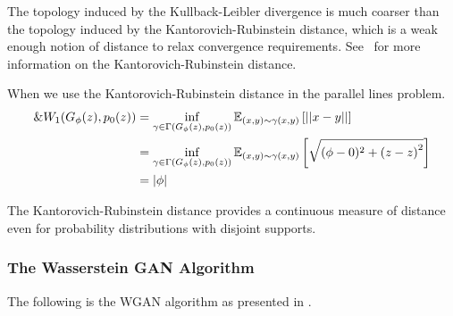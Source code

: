The topology induced by the Kullback-Leibler divergence is much
coarser than the topology induced by the Kantorovich-Rubinstein
distance, which is a weak enough notion of distance to relax
convergence requirements. See~\cite{ref:villani-2008} for more
information on the Kantorovich-Rubinstein distance.

\begin{example}
  When we use the Kantorovich-Rubinstein distance in the parallel
  lines problem.
  \begin{align}
    \&W_1(G_\phi(z), p_0(z)) & = \inf_{\gamma \in
                           \Gamma(G_\phi(z),p_0(z))}\mathbb{E}_{(x,y) \sim
                           \gamma(x, y)} \left[ || x-y || \right] \\
                         & =\inf_{\gamma \in \Gamma(G_\phi(z),
                           p_0(z))}\mathbb{E}_{(x,y) \sim \gamma(x,
                           y)} \left[ \sqrt{(\phi - 0)^2 + {(z - z)}^2}
                           \right] \\
                         & =|\phi|
  \end{align}
\end{example}

The Kantorovich-Rubinstein distance provides a continuous measure of
distance even for probability distributions with disjoint supports.

\subsubsection*{The Wasserstein GAN Algorithm}

The following is the WGAN algorithm as presented in
\cite{ref:arjovsky-2017}.

